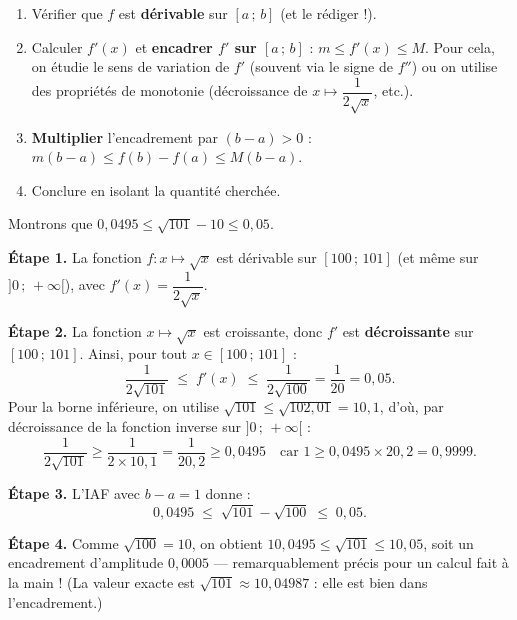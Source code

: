 \documentclass[11pt]{article}
\begin{document}
\begin{methode}
\begin{enumerate}
\item Vérifier que $f$ est \textbf{dérivable} sur $[a\,;\,b]$ (et le rédiger !).
\item Calculer $f'(x)$ et \textbf{encadrer $f'$ sur $[a\,;\,b]$} : $m \leq f'(x) \leq M$. Pour cela, on étudie le sens de variation de $f'$ (souvent via le signe de $f''$) ou on utilise des propriétés de monotonie (décroissance de $x \mapsto \dfrac{1}{2\sqrt{x}}$, etc.).
\item \textbf{Multiplier} l'encadrement par $(b-a) > 0$ : $m(b-a) \leq f(b) - f(a) \leq M(b-a)$.
\item Conclure en isolant la quantité cherchée.
\end{enumerate}
\end{methode}

\begin{exemplebox}
Montrons que $0{,}0495 \leq \sqrt{101} - 10 \leq 0{,}05$.

\textbf{Étape 1.} La fonction $f : x \mapsto \sqrt{x}$ est dérivable sur $[100\,;\,101]$ (et même sur $]0\,;\,+\infty[$), avec $f'(x) = \dfrac{1}{2\sqrt{x}}$.

\textbf{Étape 2.} La fonction $x \mapsto \sqrt{x}$ est croissante, donc $f'$ est \textbf{décroissante} sur $[100\,;\,101]$. Ainsi, pour tout $x \in [100\,;\,101]$ :
\[ \frac{1}{2\sqrt{101}} \;\leq\; f'(x) \;\leq\; \frac{1}{2\sqrt{100}} = \frac{1}{20} = 0{,}05. \]
Pour la borne inférieure, on utilise $\sqrt{101} \leq \sqrt{102{,}01} = 10{,}1$, d'où, par décroissance de la fonction inverse sur $]0\,;\,+\infty[$ :
\[ \frac{1}{2\sqrt{101}} \geq \frac{1}{2 \times 10{,}1} = \frac{1}{20{,}2} \geq 0{,}0495 \quad \text{car } 1 \geq 0{,}0495 \times 20{,}2 = 0{,}9999. \]

\textbf{Étape 3.} L'IAF avec $b - a = 1$ donne :
\[ 0{,}0495 \;\leq\; \sqrt{101} - \sqrt{100} \;\leq\; 0{,}05. \]

\textbf{Étape 4.} Comme $\sqrt{100} = 10$, on obtient $10{,}0495 \leq \sqrt{101} \leq 10{,}05$, soit un encadrement d'amplitude $0{,}0005$ — remarquablement précis pour un calcul fait à la main ! (La valeur exacte est $\sqrt{101} \approx 10{,}04987$ : elle est bien dans l'encadrement.)
\end{exemplebox}
\end{document}
